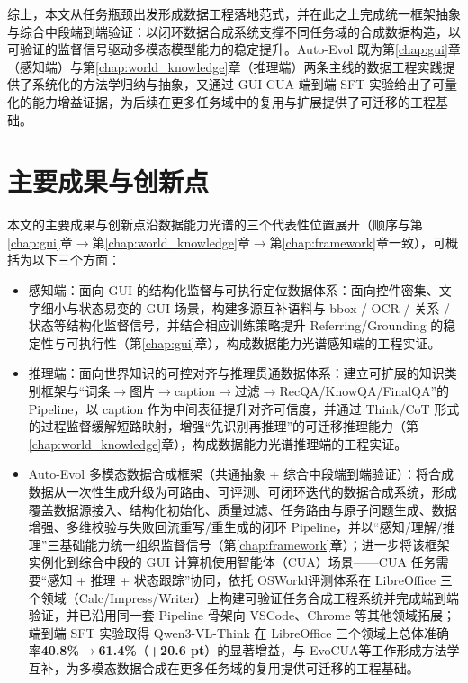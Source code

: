 综上，本文从任务瓶颈出发形成数据工程落地范式，并在此之上完成统一框架抽象与综合中段端到端验证：以闭环数据合成系统支撑不同任务域的合成数据构造，以可验证的监督信号驱动多模态模型能力的稳定提升。Auto-Evol 既为第\ref{chap:gui}章（感知端）与第\ref{chap:world_knowledge}章（推理端）两条主线的数据工程实践提供了系统化的方法学归纳与抽象，又通过 GUI CUA 端到端 SFT 实验给出了可量化的能力增益证据，为后续在更多任务域中的复用与扩展提供了可迁移的工程基础。

\section{主要成果与创新点}
本文的主要成果与创新点沿数据能力光谱的三个代表性位置展开（顺序与第\ref{chap:gui}章$\rightarrow$第\ref{chap:world_knowledge}章$\rightarrow$第\ref{chap:framework}章一致），可概括为以下三个方面：
\begin{itemize}
  \item 感知端：面向 GUI 的结构化监督与可执行定位数据体系：面向控件密集、文字细小与状态易变的 GUI 场景，构建多源互补语料与 bbox / OCR / 关系 / 状态等结构化监督信号，并结合相应训练策略提升 Referring/\allowbreak Grounding 的稳定性与可执行性（第\ref{chap:gui}章），构成数据能力光谱感知端的工程实证。
  \item 推理端：面向世界知识的可控对齐与推理贯通数据体系：建立可扩展的知识类别框架与“词条$\rightarrow$图片$\rightarrow$caption$\rightarrow$过滤$\rightarrow$RecQA/\allowbreak KnowQA/\allowbreak FinalQA”的 Pipeline，以 caption 作为中间表征提升对齐可信度，并通过 Think/CoT 形式的过程监督缓解短路映射，增强“先识别再推理”的可迁移推理能力（第\ref{chap:world_knowledge}章），构成数据能力光谱推理端的工程实证。
  \item Auto-Evol 多模态数据合成框架（共通抽象 + 综合中段端到端验证）：将合成数据从一次性生成升级为可路由、可评测、可闭环迭代的数据合成系统，形成覆盖数据源接入、结构化初始化、质量过滤、任务路由与原子问题生成、数据增强、多维校验与失败回流重写/重生成的闭环 Pipeline，并以“感知/理解/推理”三基础能力统一组织监督信号（第\ref{chap:framework}章）；进一步将该框架实例化到综合中段的 GUI 计算机使用智能体（CUA）场景——CUA 任务需要“感知 + 推理 + 状态跟踪”协同，依托 OSWorld\citep{xie2024osworld}评测体系在 LibreOffice 三个领域（Calc/\allowbreak Impress/\allowbreak Writer）上构建可验证任务合成工程系统并完成端到端验证，并已沿用同一套 Pipeline 骨架向 VSCode、Chrome 等其他领域拓展；端到端 SFT 实验取得 Qwen3-VL-Think 在 LibreOffice 三个领域上总体准确率\textbf{40.8\%$\rightarrow$61.4\%}（\textbf{+20.6 pt}）的显著增益，与 EvoCUA\citep{xue2026evocua}等工作形成方法学互补，为多模态数据合成在更多任务域的复用提供可迁移的工程基础。
\end{itemize}


